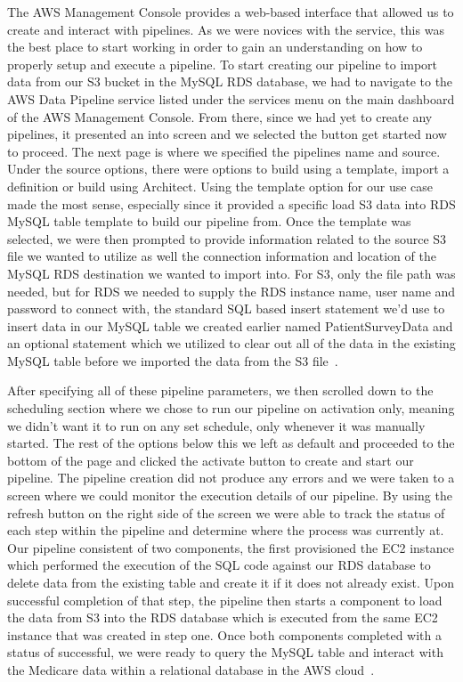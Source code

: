 The AWS Management Console provides a web-based interface that allowed us to 
create and interact with pipelines. As we were novices with the service, 
this was the best place to start working in order to gain an understanding on 
how to properly setup and execute a pipeline. To start creating our pipeline 
to import data from our S3 bucket in the MySQL RDS database, we had to 
navigate to the AWS Data Pipeline service listed under the services menu on 
the main dashboard of the AWS Management Console. From there, since we had yet 
to create any pipelines, it presented an into screen and we selected the 
button get started now to proceed. The next page is where we specified the 
pipelines name and source. Under the source options, there were options to 
build using a template, import a definition or build using Architect. Using 
the template option for our use case made the most sense, especially since it 
provided a specific load S3 data into RDS MySQL table template to build our 
pipeline from. Once the template was selected, we were then prompted to 
provide information related to the source S3 file we wanted to utilize as well 
the connection information and location of the MySQL RDS destination we wanted 
to import into. For S3, only the file path was needed, but for RDS we needed 
to supply the RDS instance name, user name and password to connect with, the 
standard SQL based insert statement we'd use to insert data in our MySQL table 
we created earlier named PatientSurveyData and an optional statement which we 
utilized to clear out all of the data in the existing MySQL table before we 
imported the data from the S3 file~\cite{hid-sp18-521-datapipelinestarting}. 

After specifying all of these pipeline parameters, we then scrolled down to 
the scheduling section where we chose to run our pipeline on activation only, 
meaning we didn't want it to run on any set schedule, only whenever it was 
manually started. The rest of the options below this we left as default and 
proceeded to the bottom of the page and clicked the activate button to create 
and start our pipeline. The pipeline creation did not produce any errors and 
we were taken to a screen where we could monitor the execution details of our 
pipeline. By using the refresh button on the right side of the screen we were 
able to track the status of each step within the pipeline and determine where 
the process was currently at. Our pipeline consistent of two components, the 
first provisioned the EC2 instance which performed the execution of the SQL 
code against our RDS database to delete data from the existing table and 
create it if it does not already exist. Upon successful completion of that 
step, the pipeline then starts a component to load the data from S3 into the 
RDS database which is executed from the same EC2 instance that was created in 
step one. Once both components completed with a status of successful, we were 
ready to query the MySQL table and interact with the Medicare data within a 
relational database in the AWS cloud~\cite{hid-sp18-521-datapipelinestarting}. 

